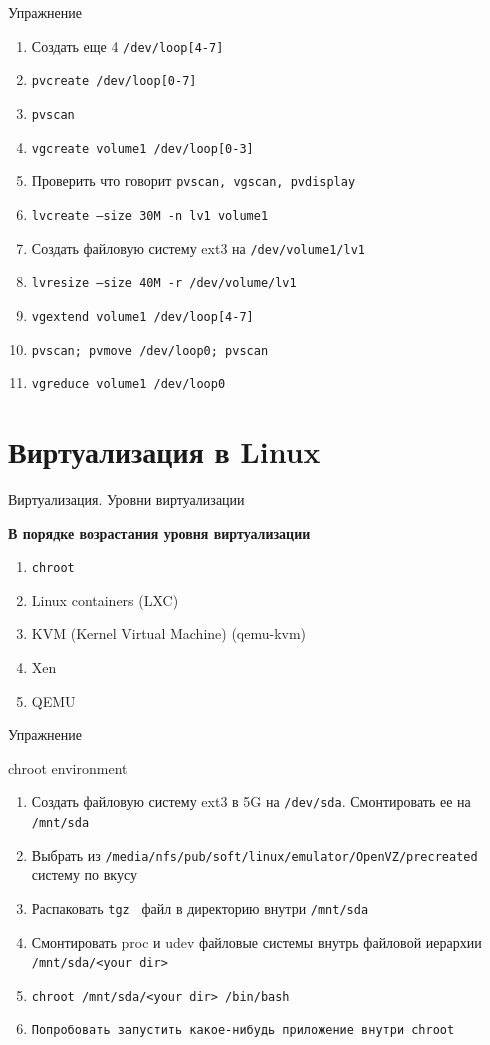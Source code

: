 \documentclass[ignorenonframetext, professionalfonts, hyperref={pdftex, unicode}]{beamer}
\begin{document}
\begin{frame}{Упражнение}
  \begin{enumerate}
    \item  Создать еще 4 {\tt /dev/loop[4-7]}
    \item  {\tt pvcreate /dev/loop[0-7]}
    \item  {\tt pvscan}
    \item  {\tt vgcreate volume1 /dev/loop[0-3]}
    \item  Проверить что говорит {\tt pvscan, vgscan, pvdisplay}
    \item  {\tt lvcreate --size 30M -n lv1 volume1}
    \item  Создать файловую систему ext3 на {\tt /dev/volume1/lv1}
    \item  {\tt lvresize --size 40M -r /dev/volume/lv1}
    \item  {\tt vgextend volume1 /dev/loop[4-7]}
    \item  {\tt pvscan; pvmove /dev/loop0; pvscan}
    \item  {\tt vgreduce volume1 /dev/loop0}
  \end{enumerate}
\end{frame}

\section {Виртуализация в Linux}
\begin{frame}{Виртуализация. Уровни виртуализации}
  \begin{center}
    \textbf{В порядке возрастания уровня виртуализации}
  \end{center}
  \begin{enumerate}
    \item {\tt chroot}
    \item Linux containers (LXC)
    \item KVM (Kernel Virtual Machine) (qemu-kvm)
    \item Xen
    \item QEMU 
  \end{enumerate}
\end{frame}

\begin{frame}{Упражнение}
  \begin{block}{chroot environment}
    \begin{enumerate}
      \item Создать файловую систему ext3 в 5G на {\tt /dev/sda}. Смонтировать ее на {\tt /mnt/sda}
      \item Выбрать из  {\tt /media/nfs/pub/soft/linux/emulator/OpenVZ/precreated} систему по вкусу
      \item Распаковать {\tt tgz } файл в директорию внутри {\tt /mnt/sda}
      \item Смонтировать proc и udev файловые системы внутрь файловой иерархии {\tt /mnt/sda/<your dir>}
      \item {\tt chroot /mnt/sda/<your dir> /bin/bash}
      \item {\tt Попробовать запустить какое-нибудь приложение внутри chroot}
    \end{enumerate}
  \end{block}
\end{frame}
\end{document}

